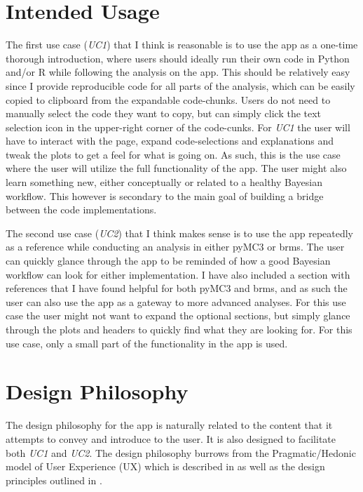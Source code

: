 \documentclass[12pt]{article}
\begin{document}
\section{Intended Usage}
The first use case (\emph{UC1}) that I think is reasonable is to use the app as a one-time
thorough introduction, where users should ideally run their own code in Python and/or R
while following the analysis on the app. This should be relatively easy since I provide reproducible code
for all parts of the analysis, which can be easily copied to clipboard from the expandable
code-chunks. Users do not need to manually select the code they want to copy, but can simply click
the text selection icon in the upper-right corner of the code-cunks.
For \emph{UC1} the user will have to interact with the page,
expand code-selections and explanations and tweak the plots to get a feel for what is going on.
As such, this is the use case where the user will utilize the full
functionality of the app.
The user might also learn something new, either conceptually or related to a
healthy Bayesian workflow.
This however is secondary to the main goal of building a bridge between the code implementations.

\vspace{5mm}

The second use case (\emph{UC2}) that I think makes sense is to use the app repeatedly as a reference
while conducting an analysis in either pyMC3 or brms. The user can quickly glance through the
app to be reminded of how a good Bayesian workflow can look for either implementation.
I have also included a section with references that I have found helpful for both pyMC3 and brms,
and as such the user can also use the app as a gateway to more advanced analyses.
For this use case the user might not want to expand the optional sections,
but simply glance through the plots and headers to quickly find what they are looking for.
For this use case, only a small part of the functionality in the app is used.

\section{Design Philosophy}
The design philosophy for the app is naturally related to the content that it attempts to convey and
introduce to the user. It is also designed to facilitate both \emph{UC1} and
\emph{UC2}. The design philosophy burrows from the Pragmatic/Hedonic model of
User Experience (UX) which is described in \textcite{hassenzahl2010experience} as well as the design
principles outlined in \textcite{mills1992macintosh}.
\end{document}
